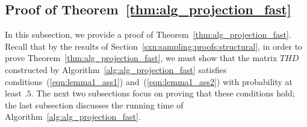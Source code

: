 \documentclass[11pt]{article}
\begin{document}
\subsection{Proof of Theorem~\ref{thm:alg_projection_fast}}
\label{sxn:projection:proofs}

In this subsection, we provide a proof of Theorem~\ref{thm:alg_projection_fast}. Recall that by the results of Section~\ref{sxn:sampling:proofs:structural}, in order to prove Theorem~\ref{thm:alg_projection_fast}, we must show that the matrix $THD$ constructed by Algorithm~\ref{alg:alg_projection_fast} satisfies conditions~(\ref{eqn:lemma1_ass1}) and~(\ref{eqn:lemma1_ass2}) with probability at least $.5$. The next two subsections focus on proving that these conditions hold; the last subsection discusses the running time of Algorithm~\ref{alg:alg_projection_fast}.
\end{document}
